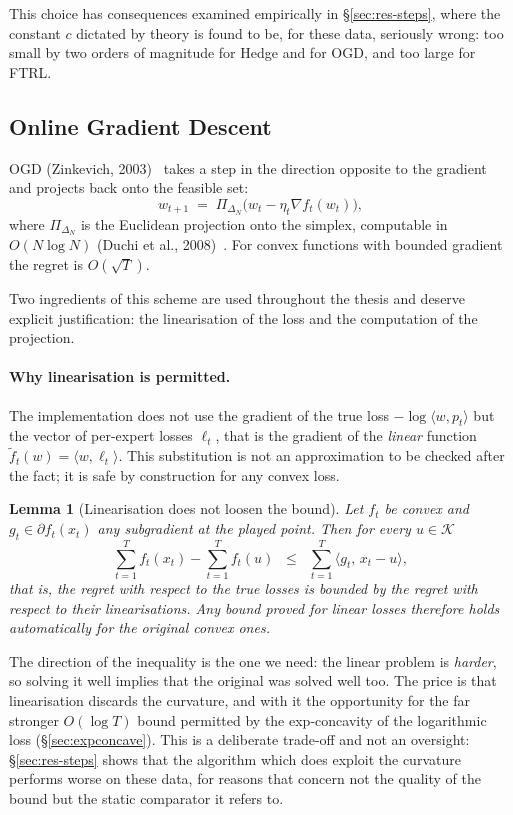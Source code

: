 \documentclass[12pt,a4paper,oneside]{report}
\renewcommand{\_}{\oldunderscore\allowbreak}
\theoremstyle{definition}
\theoremstyle{plain}
\newtheorem{lemma}[theorem]{Lemma}
\theoremstyle{definition}   %
\begin{document}
This choice has consequences examined empirically in \S\ref{sec:res-steps}, where the constant
$c$ dictated by theory is found to be, for these data, seriously wrong: too small by two orders
of magnitude for Hedge and for OGD, and too large for FTRL.

\subsection{Online Gradient Descent}

OGD (Zinkevich, 2003)~\cite{zinkevich2003} takes a step in the direction opposite to the gradient and projects back
onto the feasible set:
\[
w_{t+1} \;=\; \Pi_{\Delta_N}\!\big(w_t - \eta_t \nabla f_t(w_t)\big),
\]
where $\Pi_{\Delta_N}$ is the Euclidean projection onto the simplex, computable in
$O(N \log N)$ (Duchi et al., 2008)~\cite{duchi2008}. For convex functions with bounded gradient the regret is
$O(\sqrt{T})$.

Two ingredients of this scheme are used throughout the thesis and deserve explicit
justification: the linearisation of the loss and the computation of the projection.

\paragraph{Why linearisation is permitted.} The implementation does not use the gradient of
the true loss $-\log\langle w, p_t\rangle$ but the vector of per-expert losses $\ell_t$, that
is the gradient of the \emph{linear} function $\tilde{f}_t(w) = \langle w, \ell_t\rangle$. This
substitution is not an approximation to be checked after the fact; it is safe by construction
for any convex loss.

\begin{lemma}[Linearisation does not loosen the bound]
\label{lem:linearization}
Let $f_t$ be convex and $g_t \in \partial f_t(x_t)$ any subgradient at the played point. Then
for every $u \in \mathcal{K}$
\[
\sum_{t=1}^{T} f_t(x_t) - \sum_{t=1}^{T} f_t(u) \;\;\leq\;\; \sum_{t=1}^{T} \langle g_t,\, x_t - u\rangle,
\]
that is, the regret with respect to the true losses is bounded by the regret with respect to
their linearisations. Any bound proved for linear losses therefore holds automatically for the
original convex ones.
\end{lemma}

The direction of the inequality is the one we need: the linear problem is \emph{harder}, so
solving it well implies that the original was solved well too. The price is that linearisation
discards the curvature, and with it the opportunity for the far stronger $O(\log T)$ bound
permitted by the exp-concavity of the logarithmic loss (\S\ref{sec:expconcave}). This is a
deliberate trade-off and not an oversight: \S\ref{sec:res-steps} shows that the algorithm which
does exploit the curvature performs worse on these data, for reasons that concern not the
quality of the bound but the static comparator it refers to.
\end{document}
